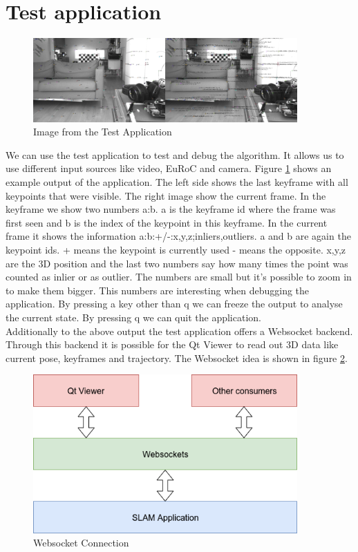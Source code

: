 \documentclass[11pt,a4paper,titlepage,oneside]{report}
\begin{document}
\section{Test application}

\begin{figure}[H]
  \includegraphics[width=0.9\textwidth]{img/test_app.png}
  \caption{Image from the Test Application}\label{fig:test_app}
\end{figure}

We can use the test application to test and debug the algorithm. It allows us to use different input sources like video, EuRoC and camera. Figure \ref{fig:test_app} shows an example output of the application. The left side shows the last keyframe with all keypoints that were visible. The right image show the current frame. In the keyframe we show two numbers a:b. a is the keyframe id where the frame was first seen and b is the index of the keypoint in this keyframe. In the current frame it shows the information a:b:+/-:x,y,z;inliers,outliers. a and b are again the keypoint ids. + means the keypoint is currently used - means the opposite. x,y,z are the 3D position and the last two numbers say how many times the point was counted as inlier or as outlier. The numbers are small but it's possible to zoom in to make them bigger. This numbers are interesting when debugging the application. By pressing a key other than q we can freeze the output to analyse the current state. By pressing q we can quit the application.\\
Additionally to the above output the test application offers a Websocket \cite{websocket} backend. Through this backend it is possible for the Qt Viewer to read out 3D data like current pose, keyframes and trajectory. The Websocket idea is shown in figure \ref{fig:websocket}.

\begin{figure}[H]
  \includegraphics[width=0.9\textwidth]{img/websocket.png}
  \caption{Websocket Connection}\label{fig:websocket}
\end{figure}
\end{document}
